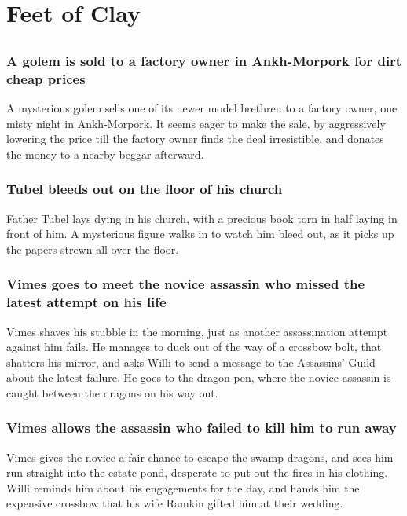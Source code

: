 \section{Feet of Clay}


\subsection{}
\subsubsection{A golem is sold to a factory owner in Ankh-Morpork for dirt cheap prices}
A mysterious golem sells one of its newer model brethren to a factory owner, one misty night in
Ankh-Morpork. It seems eager to make the sale, by aggressively lowering the price till the factory
owner finds the deal irresistible, and donates the money to a nearby beggar afterward.

\subsubsection{\Gls{Tubel} bleeds out on the floor of his church}
Father \Gls{Tubel} lays dying in his church, with a precious book torn in half laying in front of
him. A mysterious figure walks in to watch him bleed out, as it picks up the papers strewn all
over the floor.

\subsubsection{\Gls{Vimes} goes to meet the novice assassin who missed the latest attempt on his
    life}
\Gls{Vimes} shaves his stubble in the morning, just as another assassination attempt against him
fails. He manages to duck out of the way of a crossbow bolt, that shatters his mirror, and asks
\Gls{Willi} to send a message to the Assassins' Guild about the latest failure. He goes to the
dragon pen, where the novice assassin is caught between the dragons on his way out.

\subsubsection{\Gls{Vimes} allows the assassin who failed to kill him to run away}
\Gls{Vimes} gives the novice a fair chance to escape the swamp dragons, and sees him run straight
into the estate pond, desperate to put out the fires in his clothing. \Gls{Willi} reminds him about
his engagements for the day, and hands him the expensive crossbow that his wife \Gls{Ramkin} gifted
him at their wedding.

